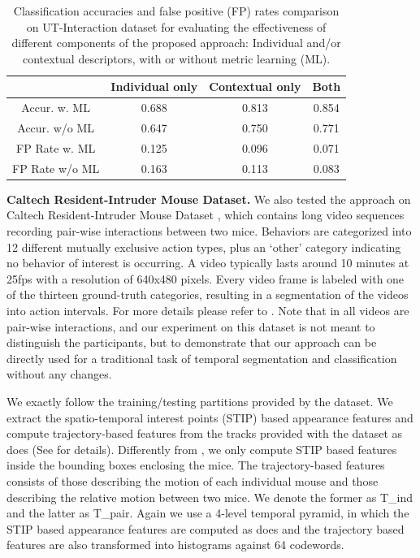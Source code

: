 \begin{table}[ht]
\centering \caption{Classification accuracies and false positive (FP) rates comparison on UT-Interaction dataset for evaluating the effectiveness of different components of the proposed approach: Individual and/or contextual descriptors, with or without metric learning (ML).}
\footnotesize{
\begin{tabular}{|c|c|c|c|}
\hline   & Individual only & Contextual only & Both \\
\hline Accur. w. ML & 0.688 & 0.813 & 0.854  \\
\hline Accur. w/o ML & 0.647 & 0.750 & 0.771    \\
\hline FP Rate w. ML &  0.125 & 0.096 & 0.071  \\
\hline FP Rate w/o ML & 0.163 & 0.113 & 0.083\\
\hline 
\end{tabular}
}
\label{UTaccuFPdegrade}
\end{table}



\vspace{0.05in}

\noindent\textbf{Caltech Resident-Intruder Mouse Dataset.} We also tested the approach on Caltech Resident-Intruder Mouse Dataset \cite{CRIM13}, which contains long video sequences recording pair-wise interactions between two mice. Behaviors are categorized into 12 different mutually exclusive action types, plus an `other' category indicating no behavior of interest is occurring. A video typically lasts around 10 minutes at 25fps with a resolution of 640x480 pixels. Every video frame is labeled with one of the thirteen ground-truth categories, resulting in a segmentation of the videos
into action intervals. For more details please refer to \cite{CRIM13}. Note that in all videos are pair-wise interactions, and our experiment on this dataset is not meant to distinguish the participants, but to demonstrate that our approach can be directly used for a traditional task of temporal segmentation and classification without any changes.

We exactly follow the training/testing partitions provided by the dataset. We extract the spatio-temporal interest points (STIP) based appearance features and compute trajectory-based features from the tracks provided with the dataset as \cite{CRIM13} does (See \cite{CRIM13} for details). Differently from \cite{CRIM13}, we only compute STIP based features inside the bounding boxes enclosing the mice. The trajectory-based features consists of those describing the motion of each individual mouse and those describing the relative motion between two mice. We denote the former as T\_ind and the latter as T\_pair. Again we use a 4-level temporal pyramid, in which the STIP based appearance features are computed as \cite{CRIM13} does and the trajectory based features are also transformed into histograms against 64 codewords. 

